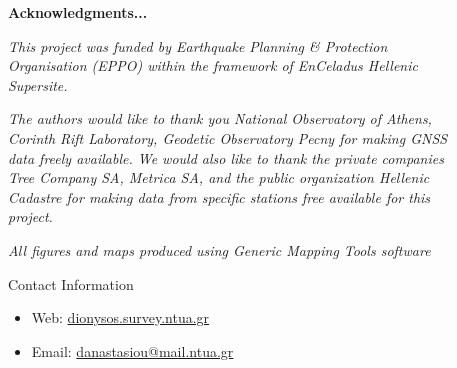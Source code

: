\documentclass[final,a0,portrait]{beamer}
\newlength{\sepwid}
\newlength{\onecolwid}
\begin{document}
\begin{frame}[t]
\begin{columns}[t]
\begin{column}{\onecolwid}

\textbf{Acknowledgments...}
\par\textit{\footnotesize This project was funded by Earthquake Planning \& Protection Organisation (EPPO) within the framework of EnCeladus Hellenic Supersite. }
\par\textit{\footnotesize The authors would like to thank you National Observatory of Athens, Corinth Rift Laboratory, Geodetic Observatory Pecny for making GNSS data freely available. We would also like to thank the private companies Tree Company SA, Metrica SA, and the public organization Hellenic Cadastre for making data from specific stations free available for this project.}
\par\textit{\footnotesize All figures and maps produced using Generic Mapping Tools software \cite{gmt}}

\begin{alertblock}{Contact Information}
\begin{itemize}
\item Web: \href{http://dionysos.survey.ntua.gr}{dionysos.survey.ntua.gr}
\item Email: \href{danastasiout@mail.ntua.gr}{danastasiou@mail.ntua.gr}
\end{itemize}
\end{alertblock}




\end{column} %


\begin{column}{\sepwid}\end{column} %

\begin{column}{\onecolwid} %



\end{column}
\end{columns}
\end{frame}
\end{document}
